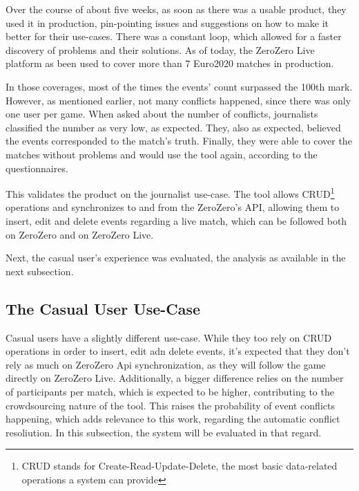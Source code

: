 Over the course of about five weeks, as soon as there was a usable product, they used it in production, pin-pointing issues and suggestions on how to make it better for their use-cases. There was a constant  loop, which allowed for a faster discovery of problems and their solutions. As of today, the ZeroZero Live platform as been used to cover more than 7 Euro2020 matches in production.

In those coverages, most of the times the events' count surpassed the 100th mark. However, as mentioned earlier, not many conflicts happened, since there was only one user per game.
When asked about the number of conflicts, journalists classified the number as very low, as expected. They, also as expected, believed the events corresponded to the match's truth. Finally, they were able to cover the matches without problems and would use the tool again, according to the questionnaires.

This validates the product on the journalist use-case. The tool allows CRUD\footnote{CRUD stands for Create-Read-Update-Delete, the most basic data-related operations a system can provide} operations and synchronizes to and from the ZeroZero's API, allowing them to insert, edit and delete events regarding a live match, which can be followed both on ZeroZero and on ZeroZero Live.

Next, the casual user's experience was evaluated, the analysis as available in the next subsection.

\subsection{The Casual User Use-Case}

Casual users have a slightly different use-case. While they too rely on CRUD operations in order to insert, edit adn delete events, it's expected that they don't rely as much on ZeroZero Api synchronization, as they will follow the game directly on ZeroZero Live. Additionally, a bigger difference relies on the number of participants per match, which is expected to be higher, contributing to the crowdsourcing nature of the tool. This raises the probability of event conflicts happening, which adds relevance to this work, regarding the automatic conflict resoliution. In this subsection, the system will be evaluated in that regard.

